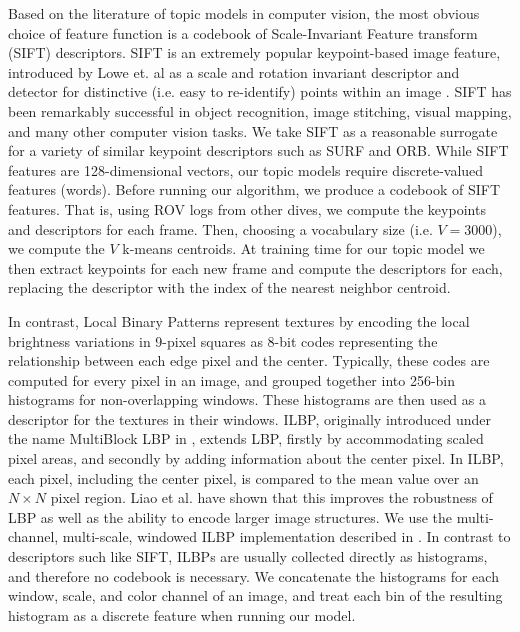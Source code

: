 Based on the literature of topic models in computer vision, the most obvious choice of feature function is a codebook of Scale-Invariant Feature transform (SIFT) descriptors. SIFT is an extremely popular keypoint-based image feature, introduced by Lowe et. al as a scale and rotation invariant descriptor and detector for distinctive (i.e. easy to re-identify) points within an image \citep{Lowe2004}. SIFT has been remarkably successful in object recognition, image stitching, visual mapping, and many other computer vision tasks. We take SIFT as a reasonable surrogate for a variety of similar keypoint descriptors such as SURF and ORB. While SIFT features are 128-dimensional vectors, our topic models require discrete-valued features (words). Before running our algorithm, we produce a codebook of SIFT features. That is, using ROV logs from other dives, we compute the keypoints and descriptors for each frame. Then, choosing a vocabulary size (i.e. $V = 3000$), we compute the $V$ k-means centroids. At training time for our topic model we then extract keypoints for each new frame and compute the descriptors for each, replacing the descriptor with the index of the nearest neighbor centroid.

In contrast, Local Binary Patterns represent textures by encoding the local brightness variations in 9-pixel squares as 8-bit codes representing the relationship between each edge pixel and the center. Typically, these codes are computed for every pixel in an image, and grouped together into 256-bin histograms for non-overlapping windows. These histograms are then used as a descriptor for the textures in their windows. ILBP, originally introduced under the name MultiBlock LBP in \citep{Liao2007}, extends LBP, firstly by accommodating scaled pixel areas, and secondly by adding information about the center pixel. In ILBP, each pixel, including the center pixel, is compared to the mean value over an $N \times N$ pixel region. Liao et al. have shown that this improves the robustness of LBP as well as the ability to encode larger image structures. We use the multi-channel, multi-scale, windowed ILBP implementation described in \citep{Paris2012}. In contrast to descriptors such like SIFT, ILBPs are usually collected directly as histograms, and therefore no codebook is necessary. We concatenate the histograms for each window, scale, and color channel of an image, and treat each bin of the resulting histogram as a discrete feature when running our model.

